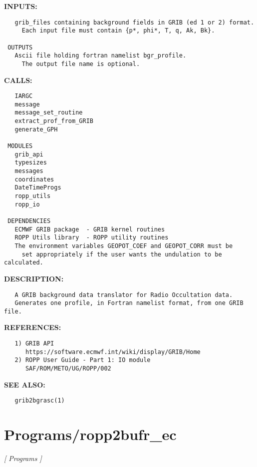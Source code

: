 \textbf{INPUTS:}\hspace{0.08in}\begin{Verbatim}
   grib_files containing background fields in GRIB (ed 1 or 2) format.
     Each input file must contain {p*, phi*, T, q, Ak, Bk}.

 OUTPUTS
   Ascii file holding fortran namelist bgr_profile. 
     The output file name is optional.
\end{Verbatim}
\textbf{CALLS:}\hspace{0.08in}\begin{Verbatim}
   IARGC
   message
   message_set_routine
   extract_prof_from_GRIB
   generate_GPH

 MODULES
   grib_api
   typesizes
   messages
   coordinates
   DateTimeProgs
   ropp_utils
   ropp_io

 DEPENDENCIES
   ECMWF GRIB package  - GRIB kernel routines
   ROPP Utils library  - ROPP utility routines
   The environment variables GEOPOT_COEF and GEOPOT_CORR must be 
     set appropriately if the user wants the undulation to be calculated.
\end{Verbatim}
\textbf{DESCRIPTION:}\hspace{0.08in}\begin{Verbatim}
   A GRIB background data translator for Radio Occultation data.
   Generates one profile, in Fortran namelist format, from one GRIB file. 
\end{Verbatim}
\textbf{REFERENCES:}\hspace{0.08in}\begin{Verbatim}
   1) GRIB API
      https://software.ecmwf.int/wiki/display/GRIB/Home
   2) ROPP User Guide - Part 1: IO module
      SAF/ROM/METO/UG/ROPP/002
\end{Verbatim}
\textbf{SEE ALSO:}\hspace{0.08in}\begin{Verbatim}
   grib2bgrasc(1)
\end{Verbatim}
\section{Programs/ropp2bufr\_ec}
\textsl{[ Programs ]}

